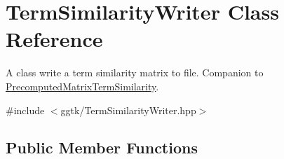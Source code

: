 \hypertarget{classTermSimilarityWriter}{}\section{Term\+Similarity\+Writer Class Reference}
\label{classTermSimilarityWriter}


A class write a term similarity matrix to file. Companion to \hyperlink{classPrecomputedMatrixTermSimilarity}{Precomputed\+Matrix\+Term\+Similarity}.  




{\ttfamily \#include $<$ggtk/\+Term\+Similarity\+Writer.\+hpp$>$}

\subsection*{Public Member Functions}
